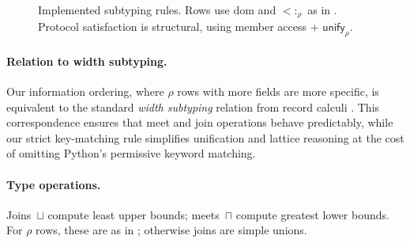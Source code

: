 \begin{figure}[t]
\centering
{}

\caption{Implemented subtyping rules. Rows use $\mathrm{dom}$ and $<:_\rho$ as in . Protocol satisfaction is structural, using member access + $\mathsf{unify}_{\rho}$.}
\label{fig:subtyping}
\end{figure}

\paragraph{Relation to width subtyping.}
Our information ordering, where $\rho$ rows with more fields are more specific, is
equivalent to the standard \emph{width subtyping} relation from record calculi
\cite{cardelli1992extensible}. This correspondence ensures that meet and join operations
behave predictably, while our strict key-matching rule simplifies unification and
lattice reasoning at the cost of omitting Python’s permissive keyword matching.

\paragraph{Type operations.}  
Joins~$\sqcup$ compute least upper bounds; meets~$\sqcap$ compute greatest lower bounds.  
For $\rho$ rows, these are as in ; otherwise joins are simple unions.

